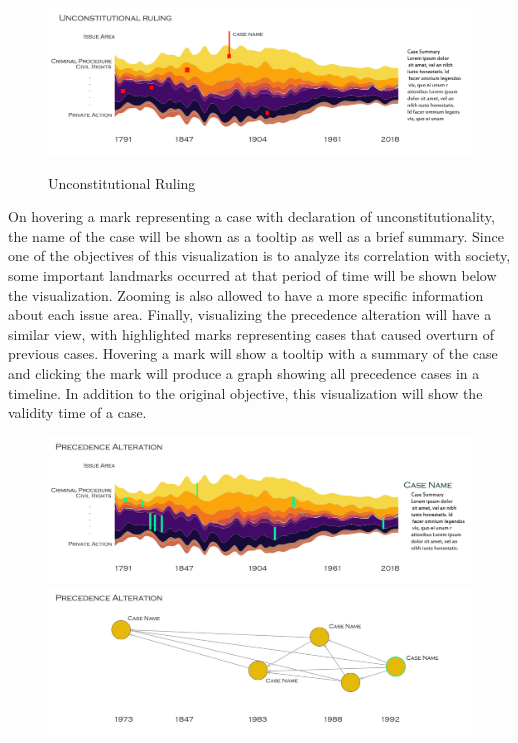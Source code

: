 \documentclass{article}
\begin{document}
\begin{figure}
    \includegraphics[width=\linewidth]{pics/unconstitutionalRuling.jpg}
    \label{fig:unconstitutionalRuling}
    \caption{Unconstitutional Ruling}
\end{figure}
\FloatBarrier
On hovering a mark representing a case with declaration of unconstitutionality, the name of the case will be shown as a tooltip as well as a brief summary. Since one of the objectives of this visualization is to analyze its correlation with society, some important landmarks occurred at that period of time will be shown below the visualization. Zooming is also allowed to have a more specific information about each issue area.
Finally, visualizing the precedence alteration will have a similar view, with highlighted marks representing cases that caused overturn of previous cases. Hovering a mark will show a tooltip with a summary of the case and clicking the mark will produce a graph showing all precedence cases in a timeline. In addition to the original objective, this visualization will show the validity time of a case.
\begin{figure}[h!]
  \includegraphics[width=\linewidth]{pics/precedenceAlteration.jpg}
  \includegraphics[width=\linewidth]{pics/precedenceAlteration1.jpg}
  \label{fig:ideologyCourt}
\end{figure}
\FloatBarrier
\end{document}
